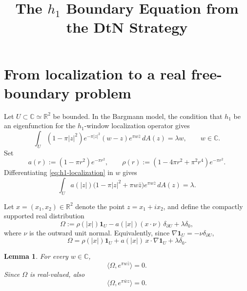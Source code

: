 \documentclass[11pt]{article}
\title{The \(h_1\) Boundary Equation from the DtN Strategy}
\author{}
\date{}
\newtheorem{lemma}[theorem]{Lemma}
\newcommand{\C}{\mathbb C}
\newcommand{\R}{\mathbb R}
\newcommand{\dd}{\,d}
\newcommand{\1}{\mathbf 1}
\begin{document}
\maketitle

\section{From localization to a real free-boundary problem}

Let \(U\subset\C\simeq\R^2\) be bounded.  In the Bargmann model, the condition that
\(h_1\) be an eigenfunction for the \(h_1\)-window localization operator gives
\begin{equation}\label{eq:h1-localization}
  \int_U (1-\pi |z|^2)e^{-\pi |z|^2}(w-z)e^{\pi w\bar z}\dd A(z)
  =
  \lambda w ,
  \qquad w\in\C .
\end{equation}
Set
\[
  a(r):=(1-\pi r^2)e^{-\pi r^2},
  \qquad
  \rho(r):=(1-4\pi r^2+\pi^2r^4)e^{-\pi r^2}.
\]
Differentiating \eqref{eq:h1-localization} in \(w\) gives
\begin{equation}\label{eq:differentiated-identity}
  \int_U a(|z|)
  \bigl(1-\pi |z|^2+\pi w\bar z\bigr)e^{\pi w\bar z}\dd A(z)
  =
  \lambda .
\end{equation}

Let \(x=(x_1,x_2)\in\R^2\) denote the point \(z=x_1+ix_2\), and define the compactly
supported real distribution
\begin{equation}\label{eq:Omega-def}
  \Omega
  :=
  \rho(|x|)\1_U
  -a(|x|)(x\cdot\nu)\,\delta_{\partial U}
  +\lambda\delta_0 ,
\end{equation}
where \(\nu\) is the outward unit normal.  Equivalently, since
\(\nabla\1_U=-\nu\delta_{\partial U}\),
\[
  \Omega
  =
  \rho(|x|)\1_U+a(|x|)\,x\cdot\nabla\1_U+\lambda\delta_0 .
\]

\begin{lemma}\label{lem:annihilation}
For every \(w\in\C\),
\[
  \bigl\langle \Omega,e^{\pi w\bar z}\bigr\rangle=0.
\]
Since \(\Omega\) is real-valued, also
\[
  \bigl\langle \Omega,e^{\pi \bar w z}\bigr\rangle=0.
\]
\end{lemma}
\end{document}
